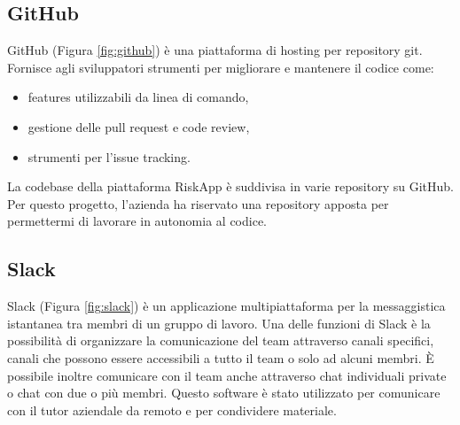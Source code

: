 \subsection{GitHub}
GitHub (Figura \ref{fig:github}) è una piattaforma di hosting per repository git.\newline
Fornisce agli sviluppatori strumenti per migliorare e mantenere il codice come:
\begin{itemize}
    \item features utilizzabili da linea di comando,
    \item gestione delle pull request e code review,
    \item strumenti per l’issue tracking.
\end{itemize}
La codebase della piattaforma RiskApp è suddivisa in varie repository su GitHub.\newline
Per questo progetto, l'azienda ha riservato una repository apposta per permettermi di lavorare in autonomia al codice.\newline

\subsection{Slack}
Slack (Figura \ref{fig:slack}) è un applicazione multipiattaforma per la messaggistica istantanea tra membri di un gruppo di lavoro.\newline
Una delle funzioni di Slack è la possibilità di organizzare la comunicazione del team attraverso canali specifici, canali che possono essere accessibili a tutto il team o solo ad alcuni membri.\newline
È possibile inoltre comunicare con il team anche attraverso chat individuali private o chat con due o più membri.\newline
Questo software è stato utilizzato per comunicare con il tutor aziendale da remoto e per condividere materiale.\newline
